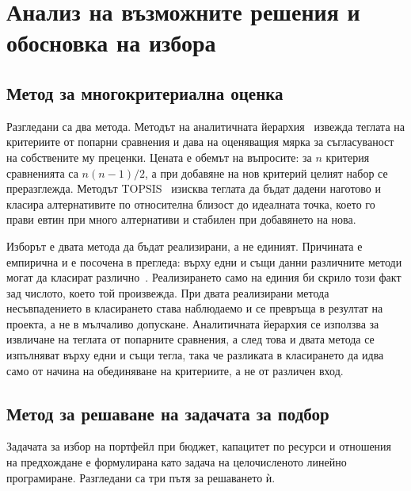 \section{Анализ на възможните решения и обосновка на избора}
\label{sec:alternatives}

\subsection{Метод за многокритериална оценка}

Разгледани са два метода. Методът на аналитичната йерархия~\cite{saaty1980ahp}
извежда теглата на критериите от попарни сравнения и дава на оценяващия мярка за
съгласуваност на собствените му преценки. Цената е обемът на въпросите: за $n$
критерия сравненията са $n(n-1)/2$, а при добавяне на нов критерий целият набор
се преразглежда. Методът TOPSIS~\cite{hwang1981topsis} изисква теглата да бъдат
дадени наготово и класира алтернативите по относителна близост до идеалната
точка, което го прави евтин при много алтернативи и стабилен при добавянето на
нова.

Изборът е двата метода да бъдат реализирани, а не единият. Причината е емпирична
и е посочена в прегледа: върху едни и същи данни различните методи могат да
класират различно~\cite{triantaphyllou2000mcdm}. Реализирането само на единия би
скрило този факт зад числото, което той произвежда. При двата реализирани метода
несъвпадението в класирането става наблюдаемо и се превръща в резултат на
проекта, а не в мълчаливо допускане. Аналитичната йерархия се използва за
извличане на теглата от попарните сравнения, а след това и двата метода се
изпълняват върху едни и същи тегла, така че разликата в класирането да идва само
от начина на обединяване на критериите, а не от различен вход.

\subsection{Метод за решаване на задачата за подбор}

Задачата за избор на портфейл при бюджет, капацитет по ресурси и отношения на
предхождане е формулирана като задача на целочисленото линейно програмиране.
Разгледани са три пътя за решаването ѝ.

